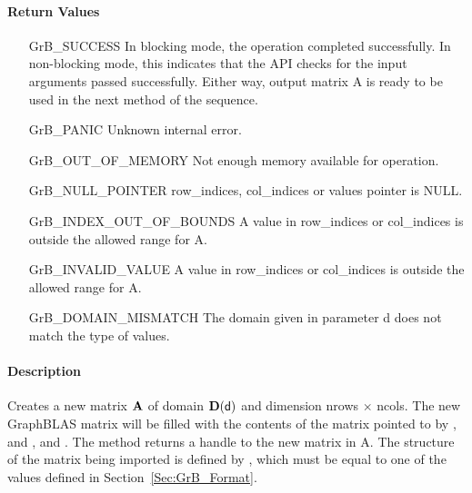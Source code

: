 \paragraph{Return Values}

\begin{itemize}[leftmargin=2.3in]
    \item[{\sf GrB\_SUCCESS}]         In blocking mode, the operation completed
    successfully. In non-blocking mode, this indicates that the API checks 
    for the input arguments passed successfully. Either way, output matrix 
    {\sf A} is ready to be used in the next method of the sequence.

    \item[{\sf GrB\_PANIC}]           Unknown internal error.
    
    \item[{\sf GrB\_OUT\_OF\_MEMORY}] Not enough memory available for operation.
    
    \item[{\sf GrB\_NULL\_POINTER}]  {\sf row\_indices}, 
    {\sf col\_indices} or {\sf values} pointer is {\sf NULL}.

    \item[{\sf GrB\_INDEX\_OUT\_OF\_BOUNDS}] A value in {\sf row\_indices} or
    {\sf col\_indices} is outside the allowed range for {\sf A}.

    \item[{\sf GrB\_INVALID\_VALUE}] A value in {\sf row\_indices} or
    {\sf col\_indices} is outside the allowed range for {\sf A}.

  \item[{\sf GrB\_DOMAIN\_MISMATCH}]  The domain given in parameter {\sf d} does
    not match the type of {\sf values}.
\end{itemize}

\paragraph{Description}

Creates a new matrix ${\bf A}$ of domain $\mathbf{D}({\sf d})$ and dimension
{\sf nrows $\times$ ncols}. The new GraphBLAS matrix will be filled with the
contents of the matrix pointed to by , and , and .
The method returns a handle to the new matrix in {\sf A}.  The structure of
the matrix being imported is defined by , which must be equal to
one of the values defined in Section~\ref{Sec:GrB_Format}.

